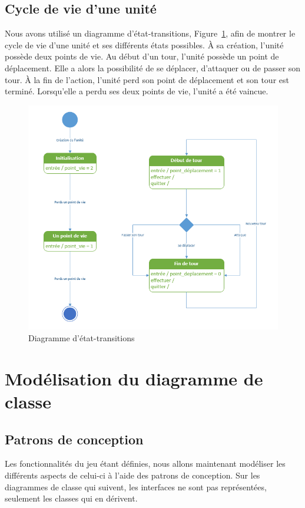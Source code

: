 \documentclass[a4paper]{article}%
\begin{document}
\subsection{Cycle de vie d'une unité}
Nous avons utilisé un diagramme d'état-transitions, Figure~\ref{fig:trans_unite}, afin de montrer le cycle de vie d'une unité et ses différents états possibles.
\`A sa création, l'unité possède deux points de vie. 
Au début d'un tour, l'unité possède un point de déplacement. Elle a alors la possibilité de se déplacer, d'attaquer ou de passer son tour. \`A la fin de l'action, l'unité perd son point de déplacement et son tour est terminé.
Lorsqu'elle a perdu ses deux points de vie, l'unité a été vaincue.

\begin{figure}[H]
    \centering
    \includegraphics[width=\textwidth]{./images/etat_transitions/cycle_unite.png}
		\caption{Diagramme d'état-transitions }
		\label{fig:trans_unite}
\end{figure}


\section{Modélisation du diagramme de classe}

\subsection{Patrons de conception}
Les fonctionnalités du jeu étant définies, nous allons maintenant modéliser les différents aspects de celui-ci à l'aide des patrons de conception. Sur les diagrammes de classe qui suivent, les interfaces ne sont pas représentées, seulement les classes qui en dérivent.
\end{document}

